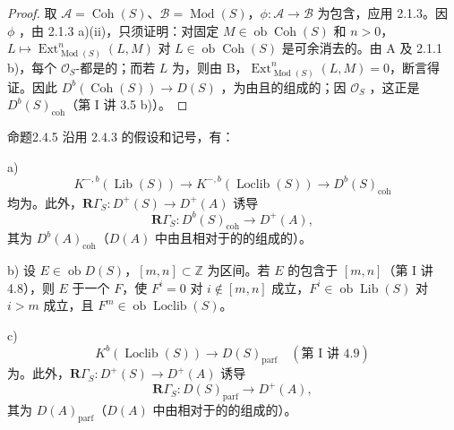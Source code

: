 \begin{proof}
取 $\mathcal A=\operatorname{Coh}(S)$、$\mathcal B=\operatorname{Mod}(S)$，$\phi:\mathcal A\to\mathcal B$ 为包含，应用 2.1.3。因 $\phi$ ，由 2.1.3 a)(ii)，只须证明：对固定 $M\in\operatorname{ob}\operatorname{Coh}(S)$ 和 $n>0$， $L\mapsto\operatorname{Ext}_{\operatorname{Mod}(S)}^n(L,M)$ 对 $L\in\operatorname{ob}\operatorname{Coh}(S)$ 是可余消去的。由 A 及 2.1.1 b)，每个 $\mathcal O_S$-都是的；而若 $L$ 为，则由 B，$\operatorname{Ext}_{\operatorname{Mod}(S)}^n(L,M)=0$，断言得证。因此 $D^b(\operatorname{Coh}(S))\to D(S)$ ，为由且的组成的；因 $\mathcal O_S$ ，这正是 $D^b(S)_{\mathrm{coh}}$（第 I 讲 3.5 b)）。
\end{proof}
\begin{SGAresult}{命题}{2.4.5}
沿用 2.4.3 的假设和记号，有：

a) 
\[
K^{-,b}(\operatorname{Lib}(S))\longrightarrow K^{-,b}(\operatorname{Loclib}(S))\longrightarrow D^b(S)_{\mathrm{coh}}
\]
均为。此外，$\mathbf R\Gamma_S:D^+(S)\to D^+(A)$ 诱导
\[
\mathbf R\Gamma_S:D^b(S)_{\mathrm{coh}}\longrightarrow D^+(A),
\]
其为 $D^b(A)_{\mathrm{coh}}$（$D(A)$ 中由且相对于的的组成的）。

b) 设 $E\in\operatorname{ob}D(S)$，$[m,n]\subset\mathbb Z$ 为区间。若 $E$ 的包含于 $[m,n]$（第 I 讲 4.8），则 $E$ 于一个 $F$，使 $F^i=0$ 对 $i\notin[m,n]$ 成立，$F^i\in\operatorname{ob}\operatorname{Lib}(S)$ 对 $i>m$ 成立，且 $F^m\in\operatorname{ob}\operatorname{Loclib}(S)$。

c) 
\[
K^b(\operatorname{Loclib}(S))\longrightarrow D(S)_{\mathrm{parf}}\quad(\text{第 I 讲 }4.9)
\]
为。此外，$\mathbf R\Gamma_S:D^+(S)\to D^+(A)$ 诱导
\[
\mathbf R\Gamma_S:D(S)_{\mathrm{parf}}\longrightarrow D^+(A),
\]
其为 $D(A)_{\mathrm{parf}}$（$D(A)$ 中由相对于的的组成的）。
\end{SGAresult}
